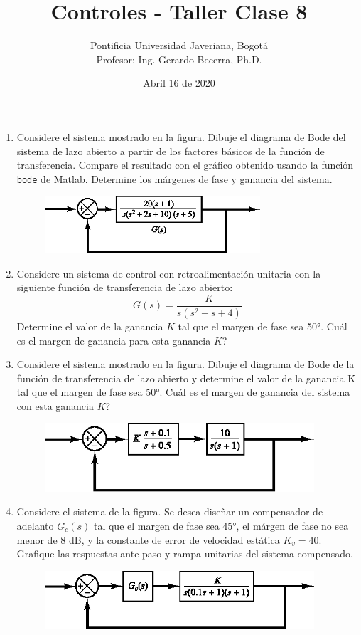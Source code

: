 \documentclass[11pt, spanish]{article}
\title{Controles - Taller Clase 8}
\author{Pontificia Universidad Javeriana, Bogotá\\Profesor: Ing. Gerardo Becerra, Ph.D.}
\date{Abril 16 de 2020}
\begin{document}
	\maketitle

\begin{enumerate}

	\item Considere el sistema mostrado en la figura. Dibuje el diagrama de Bode del sistema de lazo abierto a partir de los factores básicos de la función de transferencia. Compare el resultado con el gráfico obtenido usando la función \texttt{bode} de Matlab. Determine los márgenes de fase y ganancia del sistema.
	\begin{figure}[h]
		\centering
		\includegraphics[width=8cm]{exercise1.eps}
	\end{figure}

	\item Considere un sistema de control con retroalimentación unitaria con la siguiente función de transferencia de lazo abierto:
	\begin{equation*}
		G(s) = \frac{K}{s(s^2+s+4)}
	\end{equation*}
	Determine el valor de la ganancia $K$ tal que el margen de fase sea \ang{50}. Cuál es el margen de ganancia para esta ganancia $K$?

	\item Considere el sistema mostrado en la figura. Dibuje el diagrama de Bode de la función de transferencia de lazo abierto y determine el valor de la ganancia K tal que el margen de fase sea \ang{50}. Cuál es el margen de ganancia del sistema con esta ganancia $K$?
	\begin{figure}[h]
		\centering
		\includegraphics[width=10cm]{exercise3.eps}
	\end{figure}

	\item Considere el sistema de la figura. Se desea diseñar un compensador de adelanto $G_c(s)$ tal que el margen de fase sea $\ang{45}$, el márgen de fase no sea menor de 8 dB, y la constante de error de velocidad estática $K_v = 40$. Grafique las respuestas ante paso y rampa unitarias del sistema compensado.
	\begin{figure}[h]
		\centering
		\includegraphics[width=10cm]{exercise4.eps}
	\end{figure}
 
\end{enumerate}
\end{document}
